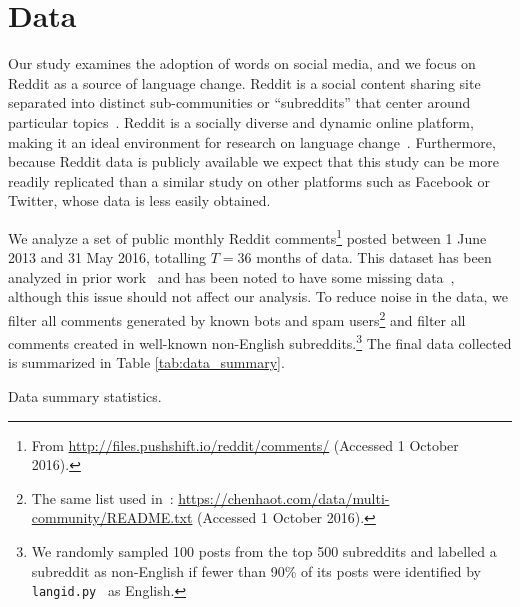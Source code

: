\section{Data}

Our study examines the adoption of words on social media, and we focus on Reddit as a source of language change. 
Reddit is a social content sharing site separated into distinct sub-communities or ``subreddits'' that center around particular topics~\cite{gilbert2013}. 
Reddit is a socially diverse and dynamic online platform, making it an ideal environment for research on language change~\cite{kershaw2016}.
Furthermore, because Reddit data is publicly available we expect that this study can be more readily replicated than a similar study on other platforms such as Facebook or Twitter, whose data is less easily obtained.

We analyze a set of public monthly Reddit comments\footnote{From \url{http://files.pushshift.io/reddit/comments/} (Accessed 1 October 2016).} posted between 1 June 2013 and 31 May 2016, totalling $T=36$ months of data.
This dataset has been analyzed in prior work~\cite{hessel2016,tan2015} and has been noted to have some missing data~\cite{gaffney2018}, although this issue should not affect our analysis.
To reduce noise in the data, we filter all comments generated by known bots and spam users\footnote{The same list used in~: \url{https://chenhaot.com/data/multi-community/README.txt} (Accessed 1 October 2016).} 
and filter all comments created in well-known non-English subreddits.\footnote{We randomly sampled 100 posts from the top 500 subreddits and labelled a subreddit as non-English if fewer than 90\% of its posts were identified by \texttt{langid.py}~\cite{lui2012} as English.}
The final data collected is summarized in Table \ref{tab:data_summary}.

\begin{table}
\small
\centering

    \caption{Data summary statistics.}
    \label{tab:data_summary}
\end{table}

%


